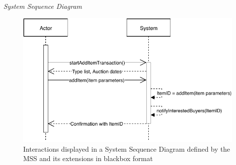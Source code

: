 \textsl{System Sequence Diagram}
\begin{figure}[H]
	\centering
	\includegraphics[scale=1]{uml/SD-bb-create.pdf}
	\caption*{Interactions displayed in a System Sequence Diagram defined by the MSS and its extensions in blackbox format}
\end{figure}